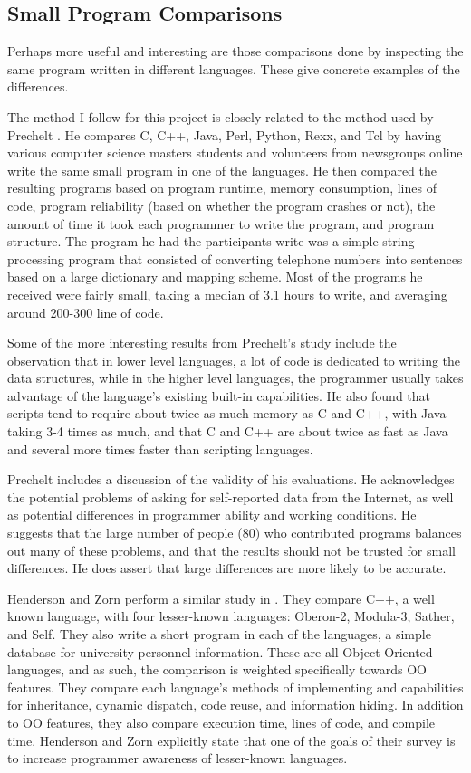 \documentclass{article}
\begin{document}
\subsection{Small Program Comparisons}

Perhaps more useful and interesting are those comparisons done by inspecting
the same program written in different languages.  These give concrete examples
of the differences.

The method I follow for this project is closely related to the method used by
Prechelt \cite{Prechelt7LangComp}.  He compares C, C++, Java, Perl, Python,
Rexx, and Tcl by having various computer science masters students and
volunteers from newsgroups online write the same small program in one of the
languages.  He then compared the resulting programs based on program runtime,
memory consumption, lines of code, program reliability (based on whether the
program crashes or not), the amount of time it took each programmer to write
the program, and program structure.  The program he had the participants write
was a simple string processing program that consisted of converting telephone
numbers into sentences based on a large dictionary and mapping scheme.  Most of
the programs he received were fairly small, taking a median of 3.1 hours to
write, and averaging around 200-300 line of code.

Some of the more interesting results from Prechelt's study include the
observation that in lower level languages, a lot of code is dedicated to
writing the data structures, while in the higher level languages, the
programmer usually takes advantage of the language's existing built-in
capabilities.  He also found that scripts tend to require about twice as much
memory as C and C++, with Java taking 3-4 times as much, and that C and C++ are
about twice as fast as Java and several more times faster than scripting
languages.

Prechelt includes a discussion of the validity of his evaluations.  He
acknowledges the potential problems of asking for self-reported data from the
Internet, as well as potential differences in programmer ability and working
conditions.  He suggests that the large number of people (80) who contributed
programs balances out many of these problems, and that the results should not be
trusted for small differences.  He does assert that large differences are more
likely to be accurate.

Henderson and Zorn perform a similar study in \cite{Henderson4OOLangComp}.
They compare C++, a well known language, with four lesser-known languages:
Oberon-2, Modula-3, Sather, and Self.  They also write a short program in each
of the languages, a simple database for university personnel information.
These are all Object Oriented languages, and as such, the comparison is
weighted specifically towards OO features.  They compare each language's
methods of implementing and capabilities for inheritance, dynamic dispatch, code
reuse, and information hiding.  In addition to OO features, they also compare
execution time, lines of code, and compile time.  Henderson and Zorn explicitly
state that one of the goals of their survey is to increase programmer awareness
of lesser-known languages.
\end{document}
